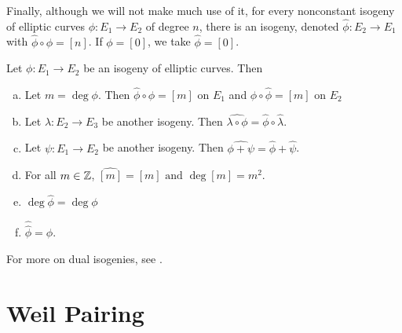 Finally, although we will not make much use of it, for every nonconstant isogeny of elliptic curves $\phi: E_1 \to E_2$ of degree $n$, there is an isogeny, denoted $\widehat{\phi}: E_2 \to E_1$ with $\widehat{\phi} \circ \phi= [n]$. If $\phi= [0]$, we take $\widehat{\phi}= [0]$. 


\begin{thm}
Let $\phi: E_1 \to E_2$ be an isogeny of elliptic curves. Then \leavevmode\vspace{-3em}
        \begin{enumerate}[(a)] \itemsep-1em
        \item Let $m= \deg \phi$. Then $\hat{\phi} \circ \phi= [m]$ on $E_1$ and $\phi \circ \hat{\phi}= [m]$ on $E_2$
        \item Let $\lambda: E_2 \to E_3$ be another isogeny. Then $\hat{\lambda \circ \phi}= \hat{\phi} \circ \hat{\lambda}$.
        \item Let $\psi: E_1 \to E_2$ be another isogeny. Then $\hat{\phi + \psi}= \hat{\phi} + \hat{\psi}$.
        \item For all $m \in \mathbb{Z}$, $\hat{[m]}= [m] \text{ and } \deg [m]= m^2$.
        \item $\deg \hat{\phi}= \deg \phi$
        \item $\hat{\hat{\phi}}= \phi$. 
        \end{enumerate}
\end{thm}


For more on dual isogenies, see \cite[III.6]{silvermanarithmetic}. 





\section{Weil Pairing\label{sec:weilpair}}

